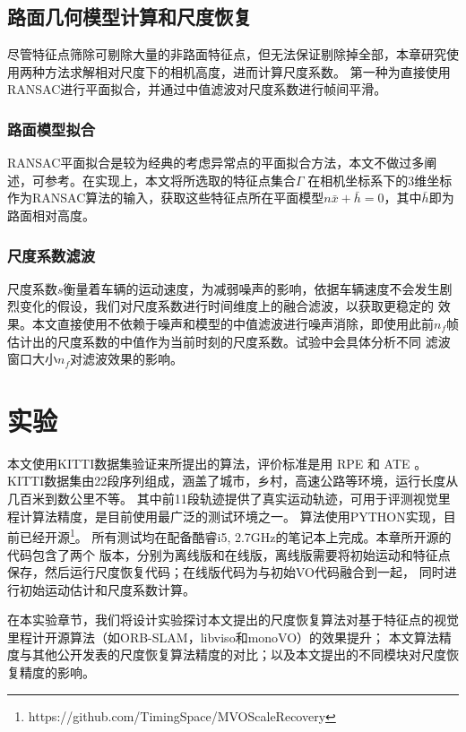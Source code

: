 \subsection{路面几何模型计算和尺度恢复}
\label{sec:road_model_calculation}
尽管特征点筛除可剔除大量的非路面特征点，但无法保证剔除掉全部，本章研究使用两种方法求解相对尺度下的相机高度，进而计算尺度系数。
第一种为直接使用RANSAC进行平面拟合，并通过中值滤波对尺度系数进行帧间平滑。
\subsubsection{路面模型拟合}
RANSAC平面拟合是较为经典的考虑异常点的平面拟合方法，本文不做过多阐述，可参考\cite{}。在实现上，本文将所选取的特征点集合$\Gamma$
在相机坐标系下的3维坐标作为RANSAC算法的输入，获取这些特征点所在平面模型$n\bar{x}+\bar{h}=0$，其中$\bar{h}$即为路面相对高度。

\subsubsection{尺度系数滤波}
尺度系数$s$衡量着车辆的运动速度，为减弱噪声的影响，依据车辆速度不会发生剧烈变化的假设，我们对尺度系数进行时间维度上的融合滤波，以获取更稳定的
效果。本文直接使用不依赖于噪声和模型的中值滤波进行噪声消除，即使用此前$n_f$帧估计出的尺度系数的中值作为当前时刻的尺度系数。试验中会具体分析不同
滤波窗口大小$n_f$对滤波效果的影响。

\section{实验}
\label{sec:mvosr_experiment}
本文使用KITTI数据集\cite{geiger2012kitti}验证来所提出的算法，评价标准是用
RPE \cite{geiger2012kitti} 和 ATE \cite{sturm2012benchmark}。
KITTI数据集由22段序列组成，涵盖了城市，乡村，高速公路等环境，运行长度从几百米到数公里不等。
其中前11段轨迹提供了真实运动轨迹，可用于评测视觉里程计算法精度，是目前使用最广泛的测试环境之一。
算法使用PYTHON实现，目前已经开源\footnote{https://github.com/TimingSpace/MVOScaleRecovery}。
所有测试均在配备酷睿i5, 2.7GHz的笔记本上完成。本章所开源的代码包含了两个
版本，分别为离线版和在线版，离线版需要将初始运动和特征点保存，然后运行尺度恢复代码；在线版代码为与初始VO代码融合到一起，
同时进行初始运动估计和尺度系数计算。

在本实验章节，我们将设计实验探讨本文提出的尺度恢复算法对基于特征点的视觉里程计开源算法（如ORB-SLAM\cite{raul2015orb}，libviso\cite{Kitt2010IV}和monoVO）的效果提升；
本文算法精度与其他公开发表的尺度恢复算法精度的对比；以及本文提出的不同模块对尺度恢复精度的影响。


